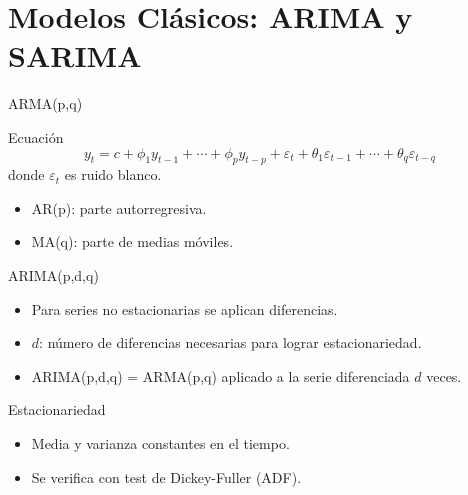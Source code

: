 \documentclass[aspectratio=169, 10pt, xcolor=table]{beamer}
\begin{document}
\section{Modelos Clásicos: ARIMA y SARIMA}

\begin{frame}{ARMA(p,q)}
    \begin{block}{Ecuación}
        \[
        y_t = c + \phi_1 y_{t-1} + \cdots + \phi_p y_{t-p} + \varepsilon_t + \theta_1 \varepsilon_{t-1} + \cdots + \theta_q \varepsilon_{t-q}
        \]
        donde $\varepsilon_t$ es ruido blanco.
    \end{block}
    \begin{itemize}
        \item AR(p): parte autorregresiva.
        \item MA(q): parte de medias móviles.
    \end{itemize}
\end{frame}

\begin{frame}{ARIMA(p,d,q)}
    \begin{itemize}
        \item Para series no estacionarias se aplican diferencias.
        \item $d$: número de diferencias necesarias para lograr estacionariedad.
        \item ARIMA(p,d,q) = ARMA(p,q) aplicado a la serie diferenciada $d$ veces.
    \end{itemize}
    \vspace{0.3cm}
    \begin{block}{Estacionariedad}
        \begin{itemize}
            \item Media y varianza constantes en el tiempo.
            \item Se verifica con test de Dickey-Fuller (ADF).
        \end{itemize}
    \end{block}
\end{frame}
\end{document}

